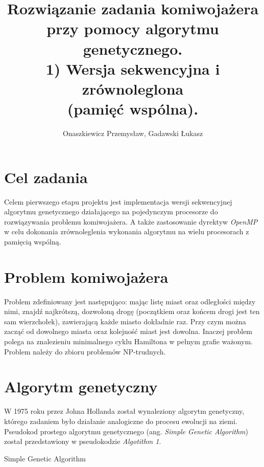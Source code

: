 \documentclass[10pt,a4paper]{article}
\author{Onaszkiewicz Przemysław, Gadawski Łukasz}
\title{Rozwiązanie zadania komiwojażera przy pomocy algorytmu genetycznego. \\ 1) Wersja sekwencyjna i zrównoleglona \\ (pamięć wspólna).}
\makeatletter
\def\BState{\State\hskip-\ALG@thistlm}
\makeatother
\begin{document}
\maketitle

\section{Cel zadania}
Celem pierwszego etapu projektu jest implementacja wersji sekwencyjnej algorytmu genetycznego działającego na pojedynczym procesorze do rozwiązywania problemu komiwojażera. A także zastosowanie dyrektyw \textit{OpenMP} w celu dokonania zrównoleglenia wykonania algorytmu na wielu procesorach z pamięcią wspólną.

\section{Problem komiwojażera}
Problem zdefiniowany jest następująco: mając listę miast oraz odległości między nimi, znajdź najkrótszą, dozwoloną drogę (początkiem oraz końcem drogi jest ten sam wierzchołek), zawierającą każde miasto dokładnie raz. Przy czym można zacząć od dowolnego miasta oraz kolejność miast jest dowolna. Inaczej problem polega na znalezieniu minimalnego cyklu Hamiltona w pełnym grafie ważonym. Problem należy do zbioru problemów NP-trudnych.

\section{Algorytm genetyczny}
W 1975 roku przez Johna Hollanda został wynaleziony algorytm genetyczny, którego zadaniem było działanie analogiczne do procesu ewolucji na ziemi. Pseudokod prostego algorytmu genetycznego (ang. \textit{Simple Genetic Algorithm}) został przedstawiony w pseudokodzie \textit{Algotithm 1}.

\begin{algorithm}
\caption{Simple Genetic Algorithm}\label{euclid}
\end{algorithm}
\end{document}
